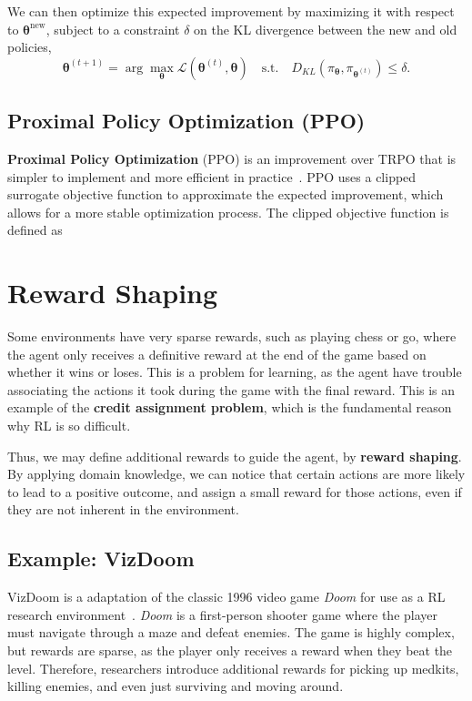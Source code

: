 \documentclass[12pt]{report}
\theoremstyle{definition}
\theoremstyle{remark}
\begin{document}
We can then optimize this expected improvement by maximizing it with respect to $\boldsymbol{\theta}^\text{new}$, subject to a constraint $\delta$ on the KL divergence between the new and old policies,
\begin{equation}
    \boldsymbol{\theta}^{(t+1)} = \arg\max_{\boldsymbol{\theta}} \mathcal{L}(\boldsymbol{\theta}^{(t)}, \boldsymbol{\theta}) \quad \text{s.t.} \quad D_{KL}\left(\pi_{\boldsymbol{\theta}}, \pi_{\boldsymbol{\theta}^{(t)}}\right) \leq \delta.
\end{equation}

\subsection{Proximal Policy Optimization (PPO)}
\textbf{Proximal Policy Optimization} (PPO) is an improvement over TRPO that is simpler to implement and more efficient in practice~\cite{schulman_proximal_2017}. PPO uses a clipped surrogate objective function to approximate the expected improvement, which allows for a more stable optimization process. The clipped objective function is defined as

\section{Reward Shaping}
Some environments have very sparse rewards, such as playing chess or go, where the agent only receives a definitive reward at the end of the game based on whether it wins or loses. This is a problem for learning, as the agent have trouble associating the actions it took during the game with the final reward. This is an example of the \textbf{credit assignment problem}, which is the fundamental reason why RL is so difficult.

Thus, we may define additional rewards to guide the agent, by \textbf{reward shaping}. By applying domain knowledge, we can notice that certain actions are more likely to lead to a positive outcome, and assign a small reward for those actions, even if they are not inherent in the environment.

\subsection{Example: VizDoom}

VizDoom is a adaptation of the classic 1996 video game \textit{Doom} for use as a RL research environment~\cite{kempka_vizdoom_2016}. \textit{Doom} is a first-person shooter game where the player must navigate through a maze and defeat enemies. The game is highly complex, but rewards are sparse, as the player only receives a reward when they beat the level. Therefore, researchers introduce additional rewards for picking up medkits, killing enemies, and even just surviving and moving around.
\end{document}
